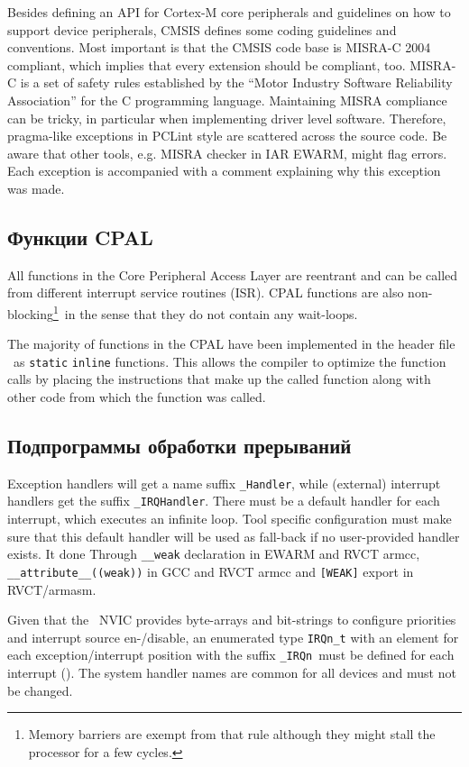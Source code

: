 Besides defining an API for Cortex-M core peripherals and guidelines on how to
support device peripherals, CMSIS defines some coding guidelines and
conventions. Most important is that the CMSIS code base is MISRA-C 2004
compliant, which implies that every extension should be compliant, too. MISRA-C
is a set of safety rules established by the “Motor Industry Software Reliability
Association” for the C programming language. Maintaining MISRA compliance can be
tricky, in particular when implementing driver level software. Therefore,
pragma-like exceptions in PCLint style are scattered across the source code. Be
aware that other tools, e.g. MISRA checker in IAR EWARM, might flag errors. Each
exception is accompanied with a comment explaining why this exception was made.

\subsection{Функции CPAL}

All functions in the Core Peripheral Access Layer are reentrant and can be
called from different interrupt service routines (ISR). CPAL functions are also
non-blocking\footnote{Memory barriers are exempt from that rule although they
might stall the processor for a few cycles.}\ in the sense that they do not 
contain any wait-loops.

The majority of functions in the CPAL have been implemented in the header file
\ as \verb|static| \verb|inline| functions. This allows the
compiler to optimize the function calls by placing the instructions that make up the called
function along with other code from which the function was called.

\subsection{Подпрограммы обработки прерываний}

Exception handlers will get a name suffix \verb|_Handler|, while (external)
interrupt handlers get the suffix \verb|_IRQHandler|. There must be a default
handler for each interrupt, which executes an infinite loop.
Tool specific configuration must make sure that this default handler will be
used as fall-back if no user-provided handler exists. It done
Through \verb|__weak| declaration in EWARM and RVCT armcc,
\verb|__attribute__((weak))| in GCC and RVCT armcc and
\verb|[WEAK]| export in RVCT/armasm.

Given that the \cm{}\ NVIC provides byte-arrays and bit-strings to configure
priorities and interrupt source en-/disable, an enumerated type \verb|IRQn_t|
with an element for each exception/interrupt position with the suffix
\verb|_IRQn|\ must be defined for each interrupt (). The system
handler names are common for all devices and must not be changed.

